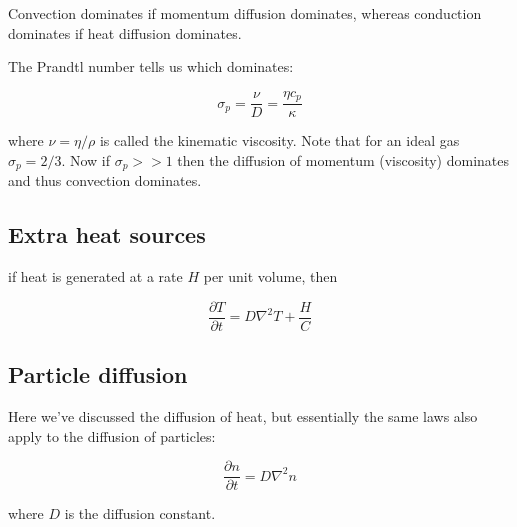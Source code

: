 \documentclass[a4paper]{article}
\begin{document}
Convection dominates if momentum diffusion dominates, whereas conduction dominates if heat diffusion dominates. 

\bigskip

The Prandtl number tells us which dominates:

\begin{equation}
	\sigma_p=\frac{\nu}{D}=\frac{\eta c_p}{\kappa}
\end{equation}

where $\nu=\eta/\rho$ is called the kinematic viscosity. Note that for an ideal gas $\sigma_p=2/3$. Now if $\sigma_p>>1$ then the diffusion of momentum (viscosity) dominates and thus convection dominates.

\subsection{Extra heat sources}

if heat is generated at a rate $H$ per unit volume, then

\begin{equation}
	\frac{\partial T}{\partial t}=D\nabla^2 T+\frac{H}{C}
\end{equation}

\subsection{Particle diffusion}

Here we've discussed the diffusion of heat, but essentially the same laws also apply to the diffusion of particles:

\begin{equation}
	\frac{\partial n}{\partial t}=D\nabla^2 n
\end{equation}

where $D$ is the diffusion constant.
\end{document}
